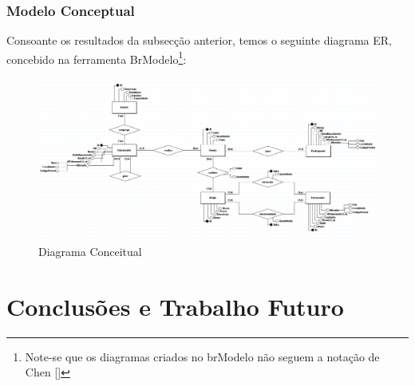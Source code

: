 \documentclass[a4paper,12pt]{scrreprt}
\begin{document}
        \subsection{Modelo Conceptual}
        Consoante os resultados da subsecção anterior, temos o seguinte diagrama ER,
        concebido na ferramenta BrModelo\footnote{Note-se que os diagramas criados no brModelo
        não seguem a notação de Chen [\cite{chen}]}:
        \begin{figure}[H]
            \centering
            \includegraphics[width=4.75in]{images/Conceptual_Com_Atributos.png}
            \caption{Diagrama Conceitual}
        \end{figure}
        
        

    

\chapter{Conclusões e Trabalho Futuro}
    



\renewcommand\bibname{Referências}

\nocite{*}
\printbibliography
\end{document}
